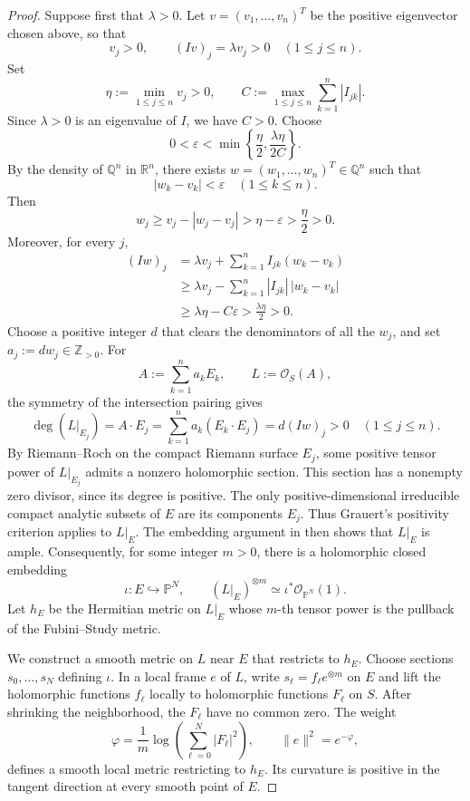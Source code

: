 \documentclass[11pt]{amsart}
\theoremstyle{definition}
\theoremstyle{remark}
\numberwithin{equation}{section}
\newcommand{\OO}{\mathcal O}
\begin{document}
\begin{proof}
Suppose first that $\lambda>0$. Let $v=(v_1,\ldots,v_n)^T$
be the positive eigenvector chosen above, so that
\[
  v_j>0,\qquad (Iv)_j=\lambda v_j>0
  \quad (1\le j\le n).
\]
Set
\[
  \eta:=\min_{1\le j\le n}v_j>0,
  \qquad
  C:=\max_{1\le j\le n}\sum_{k=1}^n |I_{jk}|.
\]
Since $\lambda>0$ is an eigenvalue of $I$, we have $C>0$.
Choose
\[
  0<\varepsilon<
  \min\left\{\frac{\eta}{2},
             \frac{\lambda\eta}{2C}\right\}.
\]
By the density of $\mathbb{Q}^n$ in $\mathbb{R}^n$, there
exists $w=(w_1,\ldots,w_n)^T\in\mathbb{Q}^n$ such that
\[
  |w_k-v_k|<\varepsilon
  \quad (1\le k\le n).
\]
Then
\[
  w_j\ge v_j-|w_j-v_j|
      >\eta-\varepsilon>\frac{\eta}{2}>0.
\]
Moreover, for every $j$,
\[
  \begin{aligned}
    (Iw)_j
      &=\lambda v_j+\sum_{k=1}^n I_{jk}(w_k-v_k)\\
      &\ge \lambda v_j
          -\sum_{k=1}^n |I_{jk}|\,|w_k-v_k|\\
      &\ge \lambda\eta-C\varepsilon
       >\frac{\lambda\eta}{2}>0.
  \end{aligned}
\]
Choose a positive integer $d$ that clears the denominators
of all the $w_j$, and set $a_j:=dw_j\in\mathbb{Z}_{>0}$.
For
\[
  A:=\sum_{k=1}^n a_kE_k,
  \qquad L:=\OO_S(A),
\]
the symmetry of the intersection pairing gives
\[
  \deg(L|_{E_j})
    =A\cdot E_j
    =\sum_{k=1}^n a_k(E_k\cdot E_j)
    =d(Iw)_j>0
    \quad (1\le j\le n).
\]
By Riemann--Roch on the compact Riemann surface $E_j$,
some positive tensor power of $L|_{E_j}$ admits a nonzero
holomorphic section. This section has a nonempty zero divisor,
since its degree is positive.
The only positive-dimensional irreducible compact analytic
subsets of $E$ are its components $E_j$.
Thus Grauert's positivity criterion
\cite[\S3, unnumbered lemma on p.~347]{Grauert1962}
applies to $L|_E$.
The embedding argument in
\cite[\S3, proof of Satz~2, pp.~343--345]{Grauert1962}
then shows that $L|_E$ is ample.
Consequently, for some integer $m>0$, there is a holomorphic
closed embedding
\[
  \iota:E\hookrightarrow\mathbb{P}^{N},
  \qquad
  (L|_E)^{\otimes m}
  \simeq \iota^*\mathcal{O}_{\mathbb{P}^{N}}(1).
\]
Let $h_E$ be the Hermitian metric on $L|_E$ whose $m$-th tensor
power is the pullback of the Fubini--Study metric.

We construct a smooth metric on $L$ near $E$ that restricts to
$h_E$. Choose sections $s_0,\ldots,s_N$ defining $\iota$.
In a local frame $e$ of $L$, write
$s_\ell=f_\ell e^{\otimes m}$ on $E$ and lift the holomorphic
functions $f_\ell$ locally to holomorphic functions $F_\ell$
on $S$. After shrinking the neighborhood, the $F_\ell$ have
no common zero. The weight
\[
 \varphi=\frac1m\log\left(\sum_{\ell=0}^N|F_\ell|^2\right),
 \qquad \|e\|^2=e^{-\varphi},
\]
defines a smooth local metric restricting to $h_E$.
Its curvature is positive in the tangent direction at every
smooth point of $E$.


\end{proof}
\end{document}
